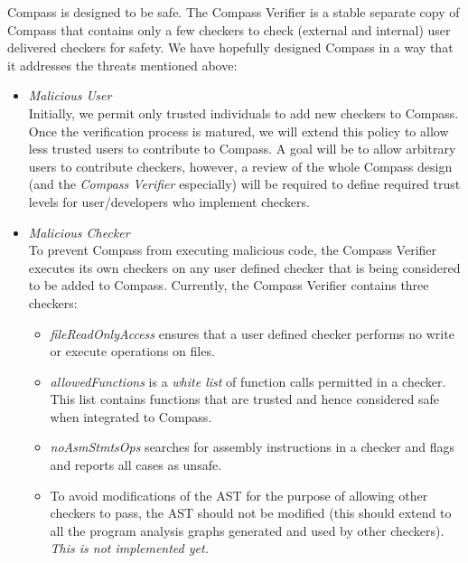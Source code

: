 Compass is designed to be safe. The Compass Verifier is a stable separate copy of Compass
that contains only a few checkers to check (external and internal) user delivered checkers
for safety.  We have hopefully designed Compass in a way that it addresses the threats
mentioned above:
\begin{itemize}
\item \emph{Malicious User} \\ Initially, we permit only trusted individuals to add new
    checkers to Compass. Once the verification process is matured, we will extend this
    policy to allow less trusted users to contribute to Compass. A goal will be to allow
    arbitrary users to contribute checkers, however, a review of the whole Compass design
    (and the {\em Compass Verifier} especially) will be required to define required trust
    levels for user/developers who implement checkers.

\item \emph{Malicious Checker} \\ To prevent Compass from executing malicious code, the Compass
    Verifier executes its own checkers on any user defined checker that is being
    considered to be added to Compass. Currently, the Compass Verifier contains three checkers:
   \begin{itemize}
      \item \emph{fileReadOnlyAccess} ensures that a user defined checker performs no write
         or execute operations on files.
      \item \emph{allowedFunctions} is a {\em white list} of function calls permitted in
         a checker. This list contains functions that are trusted and hence considered
         safe when integrated to Compass.
      \item \emph{noAsmStmtsOps} searches for assembly instructions in a checker and flags
         and reports all cases as unsafe.
      \item To avoid modifications of the AST for the purpose of allowing other checkers
         to pass, the AST should not be modified (this should extend to all the
         program analysis graphs generated and used by other checkers).
         {\em This is not implemented yet.} 
\end{itemize}


\end{itemize}
